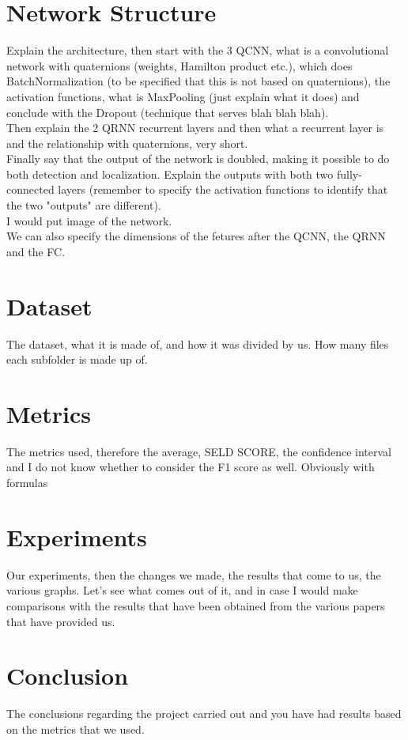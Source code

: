\documentclass[twoside,twocolumn]{article}\usepackage[utf8]{inputenc}
\begin{document}
    \section{Network Structure}
    Explain the architecture, then start with the 3 QCNN, what is a convolutional network with quaternions 
    (weights, Hamilton product etc.), which does BatchNormalization (to be specified that this is not based on quaternions), 
    the activation functions, what is MaxPooling (just explain what it does) and conclude with the Dropout (technique that serves 
    blah blah blah).
    \\ Then explain the 2 QRNN recurrent layers and then what a recurrent layer is and the relationship with quaternions, very short.
    \\ Finally say that the output of the network is doubled, making it possible to do both detection and localization. 
    Explain the outputs with both two fully-connected layers (remember to specify the activation functions to identify that the two 
    "outputs" are different).
    \\I would put image of the network.
    \\We can also specify the dimensions of the fetures after the QCNN, the QRNN and the FC.
    \section{Dataset}
    The dataset, what it is made of, and how it was divided by us. How many files each subfolder is made up of.
    \section{Metrics}
    The metrics used, therefore the average, SELD SCORE, the confidence interval and I do not know whether to consider the F1 score as well. Obviously with formulas 
    \section{Experiments}
    Our experiments, then the changes we made, the results that come to us, the various graphs.
Let's see what comes out of it, and in case I would make comparisons with the results that have been obtained from the various papers that have provided us.
    \section{Conclusion}
    The conclusions regarding the project carried out and you have had results based on the metrics that we used.
\end{document}
